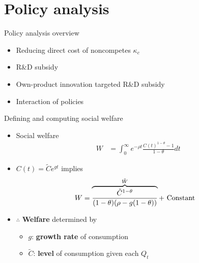 \documentclass[english,usenames,dvipsnames]{beamer}
\begin{document}
\section{Policy analysis}

\begin{frame}
\tableofcontents[currentsection]
\end{frame}

\begin{frame}{Policy analysis overview}
	\begin{itemize}
		\item Reducing direct cost of noncompetes $\kappa_c$
		\item R\&D subsidy
		\item Own-product innovation targeted R\&D subsidy
		\item Interaction of policies
	\end{itemize}
\end{frame}

\begin{frame}{Defining and computing social welfare}\label{welfare}
	\begin{itemize}
		\item Social welfare
		\begin{align*}
			W &= \int_0^{\infty} e^{-\rho t} \frac{C(t)^{1-\theta} - 1}{1-\theta} dt
		\end{align*}
		\item $C(t) = \tilde{C} e^{gt}$ implies
		\begin{align*}
			W &= \overbrace{\frac{\tilde{C}^{1-\theta}}{(1-\theta)(\rho - g(1-\theta))}}^{\mathclap{\tilde{W}}} + \text{ Constant} 
		\end{align*}
		\item $\therefore$ \alert{\textbf{Welfare}} determined by
		\begin{itemize}
			\item $g$: \alert{\textbf{growth rate}} of consumption 
			\item $\tilde{C}$: \alert{\textbf{level}} of consumption given each $Q_t$ 
		\end{itemize}
	\end{itemize}
\end{frame}
\end{document}
